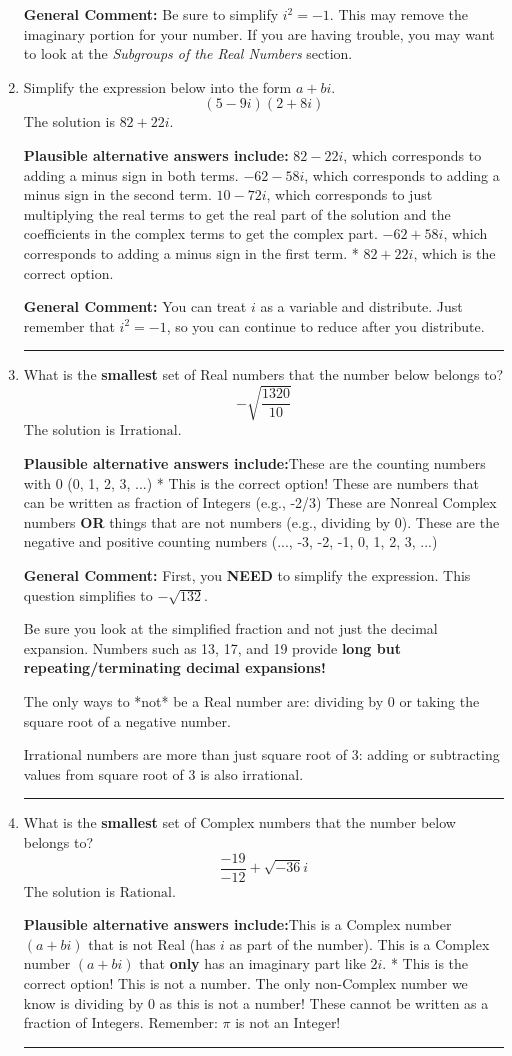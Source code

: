 \documentclass{extbook}[14pt]
\newcommand{\litem}[1]{\item #1

\rule{\textwidth}{0.4pt}}
\begin{document}
\begin{enumerate}
{\textbf{General Comment:} Be sure to simplify $i^2 = -1$. This may remove the imaginary portion for your number. If you are having trouble, you may want to look at the \textit{Subgroups of the Real Numbers} section.
}
\litem{
Simplify the expression below into the form $a+bi$.
\[ (5 - 9 i)(2 + 8 i) \]The solution is \( 82 + 22 i \).\begin{enumerate}[label=\Alph*.]
\textbf{Plausible alternative answers include:} $82 - 22 i$, which corresponds to adding a minus sign in both terms.
 $-62 - 58 i$, which corresponds to adding a minus sign in the second term.
 $10 - 72 i$, which corresponds to just multiplying the real terms to get the real part of the solution and the coefficients in the complex terms to get the complex part.
 $-62 + 58 i$, which corresponds to adding a minus sign in the first term.
* $82 + 22 i$, which is the correct option.
\end{enumerate}

\textbf{General Comment:} You can treat $i$ as a variable and distribute. Just remember that $i^2=-1$, so you can continue to reduce after you distribute.
}
\litem{
What is the \textbf{smallest} set of Real numbers that the number below belongs to?
\[ -\sqrt{\frac{1320}{10}} \]The solution is \( \text{Irrational} \).\begin{enumerate}[label=\Alph*.]
\textbf{Plausible alternative answers include:}These are the counting numbers with 0 (0, 1, 2, 3, ...)
* This is the correct option!
These are numbers that can be written as fraction of Integers (e.g., -2/3)
These are Nonreal Complex numbers \textbf{OR} things that are not numbers (e.g., dividing by 0).
These are the negative and positive counting numbers (..., -3, -2, -1, 0, 1, 2, 3, ...)
\end{enumerate}

\textbf{General Comment:} First, you \textbf{NEED} to simplify the expression. This question simplifies to $-\sqrt{132}$. 
 
 Be sure you look at the simplified fraction and not just the decimal expansion. Numbers such as 13, 17, and 19 provide \textbf{long but repeating/terminating decimal expansions!} 
 
 The only ways to *not* be a Real number are: dividing by 0 or taking the square root of a negative number. 
 
 Irrational numbers are more than just square root of 3: adding or subtracting values from square root of 3 is also irrational.
}
\litem{
What is the \textbf{smallest} set of Complex numbers that the number below belongs to?
\[ \frac{-19}{-12}+\sqrt{-36}i \]The solution is \( \text{Rational} \).\begin{enumerate}[label=\Alph*.]
\textbf{Plausible alternative answers include:}This is a Complex number $(a+bi)$ that is not Real (has $i$ as part of the number).
This is a Complex number $(a+bi)$ that \textbf{only} has an imaginary part like $2i$.
* This is the correct option!
This is not a number. The only non-Complex number we know is dividing by 0 as this is not a number!
These cannot be written as a fraction of Integers. Remember: $\pi$ is not an Integer!
\end{enumerate}

}
\end{enumerate}
\end{document}
